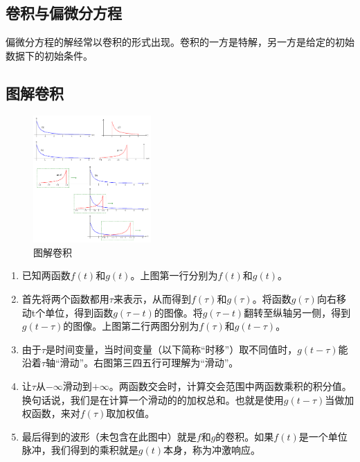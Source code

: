 \subsection{卷积与偏微分方程}
偏微分方程的解经常以卷积的形式出现。卷积的一方是特解，另一方是给定的初始数据下的初始条件。
\subsection{图解卷积}
\begin{figure}[H]
	\centering
	\includegraphics[width=0.4\textwidth]{assets/Convolution.png}
	\caption{图解卷积}
\end{figure}

\begin{enumerate}
	\item 已知两函数$f(t)$和$g(t)$。上图第一行分别为$f(t)$和$g(t)$。
	\item 首先将两个函数都用$\tau$来表示，从而得到$f(\tau)$和$g(\tau)$。将函数$g(\tau)$向右移动t个单位，得到函数$g(\tau-t)$的图像。将$g(\tau-t)$翻转至纵轴另一侧，得到$g(t-\tau)$的图像。上图第二行两图分别为$f(\tau)$和$g(t-\tau)$。
	\item 由于$\tau$是时间变量，当时间变量（以下简称“时移”）取不同值时，$g(t-\tau)$能沿着$\tau$轴“滑动”。右图第三四五行可理解为“滑动”。
	\item 让$\tau$从$-∞$滑动到$+∞$。两函数交会时，计算交会范围中两函数乘积的积分值。换句话说，我们是在计算一个滑动的的加权总和。也就是使用$g(t-\tau )$当做加权函数，来对$f(\tau)$取加权值。
	\item 最后得到的波形（未包含在此图中）就是$f$和$g$的卷积。如果$f(t)$是一个单位脉冲，我们得到的乘积就是$g(t)$本身，称为冲激响应。
\end{enumerate}